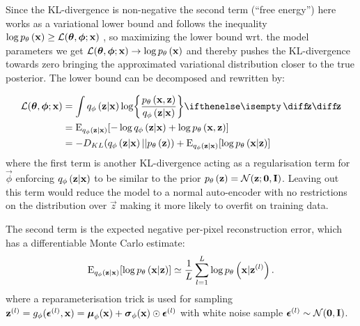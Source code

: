 Since the KL-divergence is non-negative the second term (``free energy'') here works as a variational lower bound and follows the inequality $\log p_{\theta}\left(\bm{\mathrm{x}}\right) \ge \mathcal{L}(\bm{\mathrm{\theta}},\bm{\mathrm{\phi}};\bm{\mathrm{x}})$ , so maximizing the lower bound wrt. the model parameters we get $\mathcal{L}(\bm{\mathrm{\theta}},\bm{\mathrm{\phi}};\bm{\mathrm{x}})\rightarrow \log p_{\theta}\left(\bm{\mathrm{x}}\right)$ and thereby pushes the KL-divergence towards zero bringing the approximated variational distribution closer to the true posterior.
The lower bound can be decomposed and rewritten by:

\begin{gather}
	\begin{split}
		\mathcal{L}\parens{\vec{\theta},\vec{\phi};\vec{x}} 
		& = \int \enc{\vec{z}|\vec{x}} \log \curlies*{ \frac{\dec{\vec{x},\vec{z}}}{\enc{\vec{z}|\vec{x}} } } \D{\vec{z}} \\ 
		& = \E_{\enc{\vec{z}|\vec{x}}} \brackets{- \log \enc{\vec{z}|\vec{x}} + \log \dec{\vec{x},\vec{z}} } 
		\\
		& = -D_{KL}\parens{ \enc{\vec{z}|\vec{x}}||\dec{\vec{z}} } + \E_{\enc{\vec{z}|\vec{x}}} \brackets{\log \dec{\vec{x}|\vec{z}} }    	
	\end{split} 
\end{gather}
where the first term is another KL-divergence acting as a regularisation term for $\vec{\phi}$ enforcing $q_{\phi}\left(\bm{\mathrm{z}}|\bm{\mathrm{x}}\right)$ to be similar to the prior $p_{\theta}\left(\bm{\mathrm{z}}\right)=\mathcal{N}(\bm{\mathrm{z}}; \bm{\mathrm{0}},\bm{\mathrm{I}})$. Leaving out this term would reduce the model to a normal auto-encoder with no restrictions on the distribution over $\vec{z}$ making it more likely to overfit on training data.

The second term is the expected negative per-pixel reconstruction error, which has a differentiable Monte Carlo estimate:
\begin{equation}
	\operatorname{E}_{q_{\phi}\left(\bm{\mathrm{z}}|\bm{\mathrm{x}}\right)} [\log p_{\theta}\left(\bm{\mathrm{x}}|\bm{\mathrm{z}}\right) ] \simeq \frac{1}{L}\sum^L_{l=1} \log p_{\theta}\left(\bm{\mathrm{x}}|\bm{\mathrm{z}}^{(l)}\right).
\end{equation}
where a reparameterisation trick is used for sampling $\bm{\mathrm{z}}^{(l)}= g_\phi (\bm{\mathrm{\epsilon}}^{(l)}, \bm{\mathrm{x}})= \bm{\mathrm{\mu}}_\phi(\bm{\mathrm{x}}) + \bm{\mathrm{\sigma}}_\phi(\bm{\mathrm{x}}) \odot \bm{\mathrm{\epsilon}}^{(l)}$ with white noise sample $\bm{\mathrm{\epsilon}}^{(l)} \sim \mathcal{N}(\bm{\mathrm{0}},\bm{\mathrm{I}})$.


